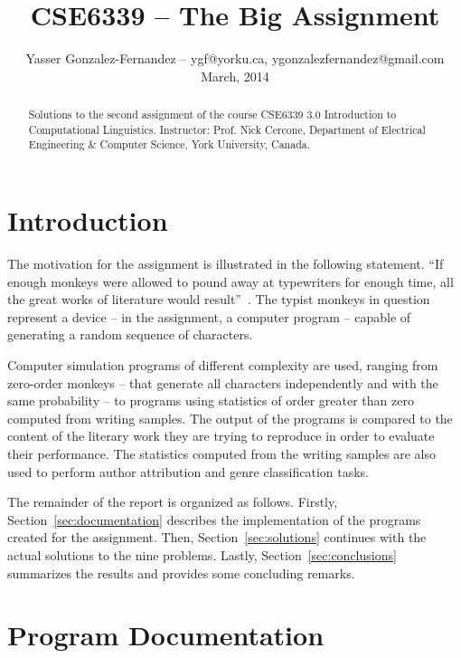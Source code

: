 \documentclass[conference]{IEEEtran}
\begin{document}
\title{CSE6339 -- The Big Assignment\vspace{-14pt}}
\author{Yasser Gonzalez-Fernandez -- ygf@yorku.ca, ygonzalezfernandez@gmail.com\vspace{4pt} \\ March, 2014}

\maketitle


\begin{abstract}
Solutions to the second assignment of the course CSE6339 3.0 Introduction to Computational Linguistics. 
Instructor: Prof. Nick Cercone, Department of Electrical Engineering \& Computer Science, York University, Canada.
\end{abstract}


\section{Introduction}

The motivation for the assignment is illustrated in the following statement.
``If enough monkeys were allowed to pound away at typewriters for enough time, all the great works of literature would result''~\cite{Bennett1976}.
The typist monkeys in question represent a device 
-- in the assignment, a computer program -- 
capable of generating a random sequence of characters.

Computer simulation programs of different complexity are used, ranging from zero-order monkeys 
-- that generate all characters independently and with the same probability -- 
to programs using statistics of order greater than zero computed from writing samples.
The output of the programs is compared to the content of the literary work they are trying to reproduce in order to evaluate their performance.
The statistics computed from the writing samples are also used to perform author attribution and genre classification tasks.

The remainder of the report is organized as follows.
Firstly, Section~\ref{sec:documentation} describes the implementation of the programs created for the assignment.
Then, Section~\ref{sec:solutions} continues with the actual solutions to the nine problems.
Lastly, Section~\ref{sec:conclusions} summarizes the results and provides some concluding remarks.


\section{Program Documentation\label{sec:documentation}}
\end{document}
